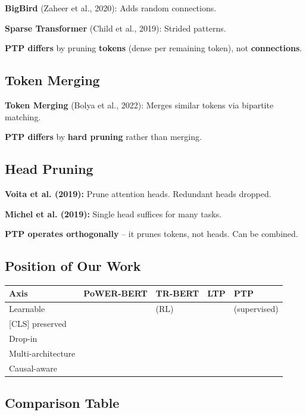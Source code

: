 \textbf{BigBird} (Zaheer et al., 2020): Adds random connections.

\textbf{Sparse Transformer} (Child et al., 2019): Strided patterns.

\textbf{PTP differs} by pruning \textbf{tokens} (dense per remaining token), not 
\textbf{connections}.

\subsection{Token Merging}

\textbf{Token Merging} (Bolya et al., 2022): Merges similar tokens via bipartite 
matching.

\textbf{PTP differs} by \textbf{hard pruning} rather than merging.

\subsection{Head Pruning}

\textbf{Voita et al. (2019):} Prune attention heads. Redundant heads dropped.

\textbf{Michel et al. (2019):} Single head suffices for many tasks.

\textbf{PTP operates orthogonally} -- it prunes tokens, not heads. Can be combined.

\subsection{Position of Our Work}

\begin{table}[H]
\centering
\small
\begin{tabular}{lllll}
\toprule
\textbf{Axis} & \textbf{PoWER-BERT} & \textbf{TR-BERT} & \textbf{LTP} & \textbf{PTP} \\
\midrule
Learnable &  & (RL) &  & (supervised) \\
 {[}CLS] preserved &  &  &  &  \\
Drop-in &  &  &  &  \\
Multi-architecture &  &  &  &  \\
Causal-aware &  &  &  &  \\
\bottomrule
\end{tabular}
\end{table}

\subsection{Comparison Table}

